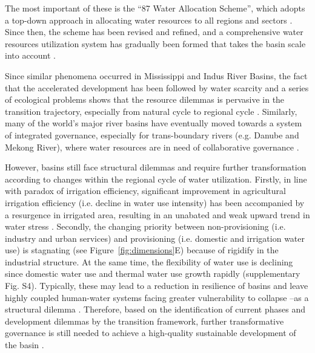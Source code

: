 \documentclass[9pt, twocolumn, twoside, lineno]{pnas-new}
\begin{document}
The most important of these is the “87 Water Allocation Scheme”, which adopts a top-down approach in allocating water resources to all regions and sectors \cite{wangThirtyYearsYellow2018}. Since then, the scheme has been revised and refined, and a comprehensive water resources utilization system has gradually been formed that takes the basin scale into account \cite{wangThirtyYearsYellow2018}. 

Since similar phenomena occurred in Mississippi and Indus River Basins, the fact that the accelerated development has been followed by water scarcity and a series of ecological problems shows that the resource dilemmas is pervasive in the transition trajectory, especially from natural cycle to regional cycle 
\cite{bestAnthropogenicStressesWorld2019,cummingResilienceBigRiver2011}.
Similarly, many of the world's major river basins have eventually moved towards a system of integrated governance, especially for trans-boundary rivers (e.g. Danube and Mekong River), where water resources are in need of collaborative governance \cite{bodinCollaborativeEnvironmentalGovernance2017}.


However, basins still face structural dilemmas and require further transformation according to changes within the regional cycle of water utilization. 
Firstly, in line with paradox of irrigation efficiency, significant improvement in agricultural irrigation efficiency (i.e. decline in water use intensity) has been accompanied by a resurgence in irrigated area, resulting in an unabated and weak upward trend in water stress \cite{graftonParadoxIrrigationEfficiency2018}.
Secondly, the changing priority between non-provisioning (i.e. industry and urban services) and provisioning (i.e. domestic and irrigation water use) is stagnating (see Figure~\ref{fig:dimensions}E) because of rigidify in the industrial structure. 
At the same time, the flexibility of water use is declining since domestic water use and thermal water use growth rapidly (supplementary Fig. S4). 
Typically, these may lead to a reduction in resilience of basins and leave highly coupled human-water systems facing greater vulnerability to collapse --as a structural dilemma \cite{cummingResilienceBigRiver2011}. Therefore, based on the identification of current phases and development dilemmas by the transition framework, further transformative governance is still needed to achieve a high-quality sustainable development of the basin \cite{scoonesTransformationsSustainabilityCombining2020a}.
\end{document}
